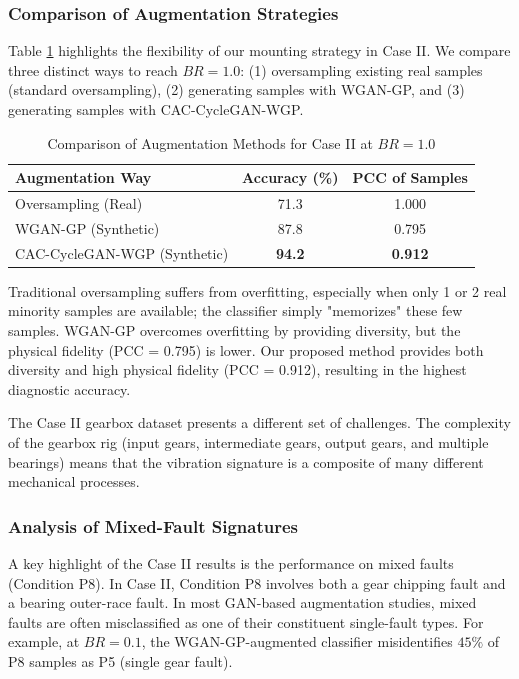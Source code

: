 \subsubsection{Comparison of Augmentation Strategies}
Table \ref{tab:aug_comparison_case2} highlights the flexibility of our mounting strategy in Case II. We compare three distinct ways to reach $BR=1.0$: (1) oversampling existing real samples (standard oversampling), (2) generating samples with WGAN-GP, and (3) generating samples with CAC-CycleGAN-WGP.

\begin{table}[htbp]
\centering
\caption{Comparison of Augmentation Methods for Case II at $BR=1.0$}
\label{tab:aug_comparison_case2}
\begin{tabular}{lcc}
\hline
\textbf{Augmentation Way} & \textbf{Accuracy (\%)} & \textbf{PCC of Samples} \\ \hline
Oversampling (Real) & 71.3 & 1.000 \\
WGAN-GP (Synthetic) & 87.8 & 0.795 \\
CAC-CycleGAN-WGP (Synthetic) & \textbf{94.2} & \textbf{0.912} \\
\hline
\end{tabular}
\end{table}

Traditional oversampling suffers from overfitting, especially when only 1 or 2 real minority samples are available; the classifier simply "memorizes" these few samples. WGAN-GP overcomes overfitting by providing diversity, but the physical fidelity (PCC = 0.795) is lower. Our proposed method provides both diversity and high physical fidelity (PCC = 0.912), resulting in the highest diagnostic accuracy.

The Case II gearbox dataset presents a different set of challenges. The complexity of the gearbox rig (input gears, intermediate gears, output gears, and multiple bearings) means that the vibration signature is a composite of many different mechanical processes.

\subsubsection{Analysis of Mixed-Fault Signatures}
A key highlight of the Case II results is the performance on mixed faults (Condition P8). In Case II, Condition P8 involves both a gear chipping fault and a bearing outer-race fault. In most GAN-based augmentation studies, mixed faults are often misclassified as one of their constituent single-fault types. For example, at $BR=0.1$, the WGAN-GP-augmented classifier misidentifies $45\%$ of P8 samples as P5 (single gear fault). 

